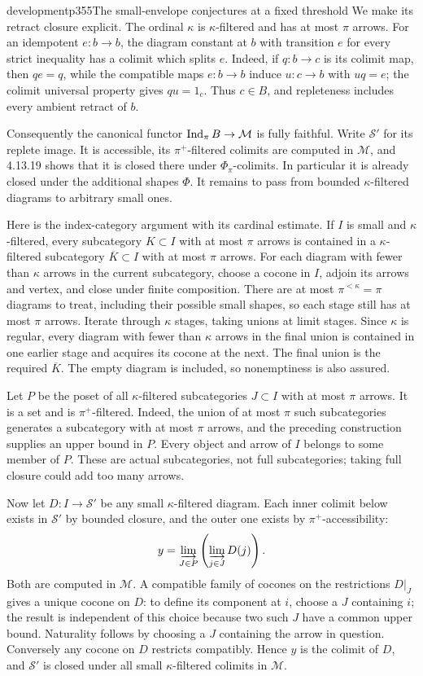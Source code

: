\begin{dcomment}{development}{p355}{The small-envelope conjectures at a fixed threshold}
We make its retract closure explicit. The ordinal $\kappa$ is $\kappa$-filtered and has at most $\pi$ arrows. For an idempotent $e:b\to b$, the diagram constant at $b$ with transition $e$ for every strict inequality has a colimit which splits $e$. Indeed, if $q:b\to c$ is its colimit map, then $qe=q$, while the compatible maps $e:b\to b$ induce $u:c\to b$ with $uq=e$; the colimit universal property gives $qu=1_c$. Thus $c\in B$, and repleteness includes every ambient retract of $b$.

Consequently the canonical functor $\operatorname{Ind}_\pi B\to\mathcal M$ is fully faithful. Write $\mathcal S'$ for its replete image. It is accessible, its $\pi^+$-filtered colimits are computed in $\mathcal M$, and 4.13.19 shows that it is closed there under $\Phi_\pi$-colimits. In particular it is already closed under the additional shapes $\Phi$. It remains to pass from bounded $\kappa$-filtered diagrams to arbitrary small ones.

Here is the index-category argument with its cardinal estimate. If $I$ is small and $\kappa$-filtered, every subcategory $K\subset I$ with at most $\pi$ arrows is contained in a $\kappa$-filtered subcategory $\overline K\subset I$ with at most $\pi$ arrows. For each diagram with fewer than $\kappa$ arrows in the current subcategory, choose a cocone in $I$, adjoin its arrows and vertex, and close under finite composition. There are at most $\pi^{<\kappa}=\pi$ diagrams to treat, including their possible small shapes, so each stage still has at most $\pi$ arrows. Iterate through $\kappa$ stages, taking unions at limit stages. Since $\kappa$ is regular, every diagram with fewer than $\kappa$ arrows in the final union is contained in one earlier stage and acquires its cocone at the next. The final union is the required $\overline K$. The empty diagram is included, so nonemptiness is also assured.

Let $P$ be the poset of all $\kappa$-filtered subcategories $J\subset I$ with at most $\pi$ arrows. It is a set and is $\pi^+$-filtered. Indeed, the union of at most $\pi$ such subcategories generates a subcategory with at most $\pi$ arrows, and the preceding construction supplies an upper bound in $P$. Every object and arrow of $I$ belongs to some member of $P$. These are actual subcategories, not full subcategories; taking full closure could add too many arrows.

Now let $D:I\to\mathcal S'$ be any small $\kappa$-filtered diagram. Each inner colimit below exists in $\mathcal S'$ by bounded closure, and the outer one exists by $\pi^+$-accessibility:
\[
 y=\varinjlim_{J\in P}\left(\varinjlim_{j\in J}D(j)\right).
\]
Both are computed in $\mathcal M$. A compatible family of cocones on the restrictions $D|_J$ gives a unique cocone on $D$: to define its component at $i$, choose a $J$ containing $i$; the result is independent of this choice because two such $J$ have a common upper bound. Naturality follows by choosing a $J$ containing the arrow in question. Conversely any cocone on $D$ restricts compatibly. Hence $y$ is the colimit of $D$, and $\mathcal S'$ is closed under all small $\kappa$-filtered colimits in $\mathcal M$.


\end{dcomment}
